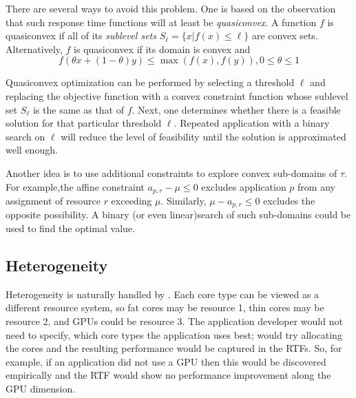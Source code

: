 There are several ways to avoid this problem.  One is based on the observation that such response time functions
will at least be \emph{quasiconvex}.  A function $f$ is quasiconvex if all of its \emph{sublevel sets}
$S_\ell = \{x | f(x) \leq \ell\}$ are convex sets.
Alternatively, $f$ is quasiconvex if its domain is convex and
\begin{displaymath}
f(\theta x + (1-\theta)y) \leq \max(f(x),f(y)), 0 \leq \theta \leq 1
\end{displaymath}

Quasiconvex optimization can be performed by selecting a threshold $\ell$ and replacing the objective function
with a convex constraint function whose sublevel set $S_\ell$ is the same as that of $f$.
Next, one determines whether there is a feasible solution for that particular threshold $\ell$.
Repeated application with a binary search on $\ell$ will reduce the level of feasibility
until the solution is approximated well enough.

Another idea is to use additional constraints to explore convex sub-domains of $\tau$.
For example,the affine constraint $a_{p,r} - \mu \leq 0$ excludes application $p$ from any assignment of resource $r$ exceeding $\mu$.  Similarly, $\mu - a_{p,r} \leq 0$ excludes the opposite possibility.
A binary (or even linear)search of such sub-domains could be used to find the optimal value.


\subsection{Heterogeneity}

Heterogeneity is naturally handled by \pacora.  Each core type can be viewed as a different resource system, so fat cores may be resource 1, thin cores may be resource 2, and GPUs could be resource 3.  The application developer would not need to specify, which core types the application uses best; \pacora would try allocating the cores and the resulting performance would be captured in the RTFs.  So, for example, if an application did not use a GPU then this would be discovered empirically and the RTF would show no performance improvement along the GPU dimension.  










